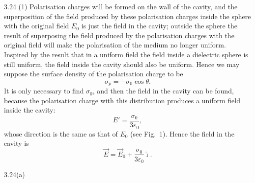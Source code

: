 \begin{solution}{3.24}
(1) Polarisation charges will be formed on the wall of the cavity, and the superposition of the field produced by these polarisation charges inside the sphere with the original field $E_0$ is just the field in the cavity; outside the sphere the result of superposing the field produced by the polarisation charges with the original field will make the polarisation of the medium no longer uniform. Inspired by the result that in a uniform field the field inside a dielectric sphere is still uniform, the field inside the cavity should also be uniform. Hence we may suppose the surface density of the polarisation charge to be
\[
\sigma_p=-\sigma_0\cos\theta.
\]
It is only necessary to find $\sigma_0$, and then the field in the cavity can be found, because the polarisation charge with this distribution produces a uniform field inside the cavity:
\[
E'=\frac{\sigma_0}{3\varepsilon_0},
\]
whose direction is the same as that of $E_0$ (see Fig.~1). Hence the field in the cavity is
\[
\vec{E}=\vec{E}_0+\frac{\sigma_0}{3\varepsilon_0}\hat{\imath}.
\]

\begin{figbox}{3.24(a)}
\end{figbox}


\end{solution}
